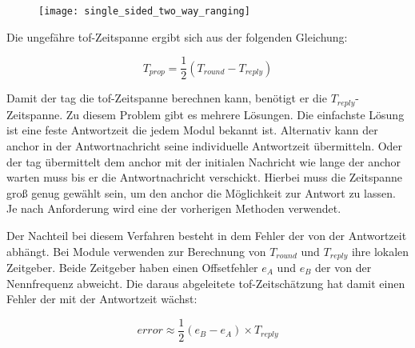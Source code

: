 \begin{figure}
	\centering
	\texttt{[image: single\_sided\_two\_way\_ranging]}
	\label{fig:single_sided_two_way_ranging}
\end{figure}

Die ungefähre \Gls{tof}-Zeitspanne ergibt sich aus der folgenden Gleichung:

\begin{equation}
T_{prop}=\frac{1}{2}\left(T_{round}-T_{reply}\right)
\end{equation}

Damit der \Gls{tag} die \Gls{tof}-Zeitspanne berechnen kann, benötigt er die $T_{reply}$-Zeitspanne. Zu diesem Problem gibt es mehrere Lösungen. Die einfachste Lösung ist eine feste Antwortzeit die jedem Modul bekannt ist. Alternativ kann der \Gls{anchor} in der Antwortnachricht seine individuelle Antwortzeit übermitteln. Oder der \Gls{tag} übermittelt dem \Gls{anchor} mit der initialen Nachricht wie lange der \Gls{anchor} warten muss bis er die Antwortnachricht verschickt. Hierbei muss die Zeitspanne groß genug gewählt sein, um den \Gls{anchor} die Möglichkeit zur Antwort zu lassen. Je nach Anforderung wird eine der vorherigen Methoden verwendet.

Der Nachteil bei diesem Verfahren besteht in dem Fehler der von der Antwortzeit abhängt. Bei Module verwenden zur Berechnung von $T_{round}$ und $T_{reply}$ ihre lokalen Zeitgeber. Beide Zeitgeber haben einen Offsetfehler $e_{A}$ und $e_{B}$ der von der Nennfrequenz abweicht. Die daraus abgeleitete \Gls{tof}-Zeitschätzung hat damit einen Fehler der mit der Antwortzeit wächst:

\begin{equation}
error\approx\frac{1}{2}\left(e_B-e_A\right)\times T_{reply}
\end{equation}


%
%
